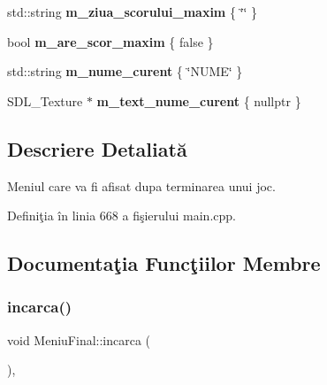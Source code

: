 \begin{DoxyCompactItemize}
\item 
\mbox{\label{classMeniuFinal_a3fd4cb6ddc4cfd8bb84cfad734137d8c}} 
std\+::string {\bfseries m\+\_\+ziua\+\_\+scorului\+\_\+maxim} \{ \char`\"{}\char`\"{} \}
\item 
\mbox{\label{classMeniuFinal_a7e6102d7ba03592db9af4d2ff8a3c0de}} 
bool {\bfseries m\+\_\+are\+\_\+scor\+\_\+maxim} \{ false \}
\item 
\mbox{\label{classMeniuFinal_af0bf7286afbfcf28139aed5fd426a1c8}} 
std\+::string {\bfseries m\+\_\+nume\+\_\+curent} \{ \char`\"{}N\+U\+ME\char`\"{} \}
\item 
\mbox{\label{classMeniuFinal_a9c703f1f5632ca0acfef05a7030647b5}} 
S\+D\+L\+\_\+\+Texture $\ast$ {\bfseries m\+\_\+text\+\_\+nume\+\_\+curent} \{ nullptr \}
\end{DoxyCompactItemize}


\subsection{Descriere Detaliată}
Meniul care va fi afisat dupa terminarea unui joc. 

Definiţia în linia 668 a fişierului main.\+cpp.



\subsection{Documentaţia Funcţiilor Membre}
\mbox{\label{classMeniuFinal_a4a1f2a872c6d0cef0e3f0a8e1545f5de}} 
\subsubsection{\texorpdfstring{incarca()}{incarca()}}
{\footnotesize\ttfamily void Meniu\+Final\+::incarca (\begin{DoxyParamCaption}\item[{\hyperlink{classStadiulJocului}{Stadiul\+Jocului} \&}]{ }\end{DoxyParamCaption})\hspace{0.3cm}{\ttfamily [override]}, {\ttfamily [virtual]}}

